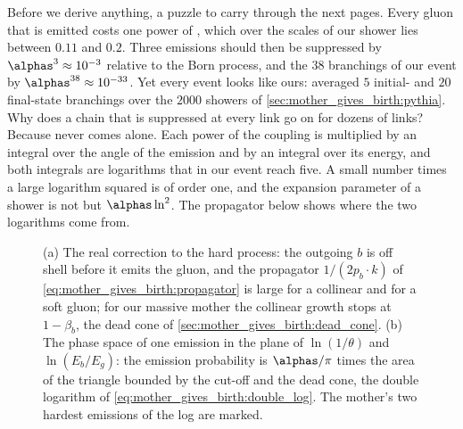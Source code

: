 Before we derive anything, a puzzle to carry through the next pages. Every
gluon that is emitted costs one power of \alphas, which over the scales of
our shower lies between $0.11$ and $0.2$. Three emissions should then be
suppressed by $\alphas^3\approx10^{-3}$ relative to the Born process, and
the $38$ branchings of our event by $\alphas^{38}\approx10^{-33}$. Yet
every event looks like ours: \PYTHIA averaged $5$ initial- and $20$
final-state branchings over the $2000$ showers of
\cref{sec:mother_gives_birth:pythia}. Why does a chain that is suppressed
at every link go on for dozens of links? Because \alphas never comes alone.
Each power of the coupling is multiplied by an integral over the angle of
the emission and by an integral over its energy, and both integrals are
logarithms that in our event reach five. A small number times a large
logarithm squared is of order one, and the expansion parameter of a shower
is not \alphas but $\alphas\ln^2$. The propagator below shows where the two
logarithms come from.

\begin{figure}[htbp]\centering
\resizebox{\textwidth}{!}{}
\caption[The propagator that makes a quark radiate, and the double-logarithmic phase space]{(a) The real correction to the hard process: the outgoing $b$ is off shell before it emits the gluon, and the propagator $1/(2p_b\cdot k)$ of \cref{eq:mother_gives_birth:propagator} is large for a collinear and for a soft gluon; for our massive mother the collinear growth stops at $1-\beta_b$, the dead cone of \cref{sec:mother_gives_birth:dead_cone}. (b) The phase space of one emission in the plane of $\ln(1/\theta)$ and $\ln(E_b/E_g)$: the emission probability is $\alphas/\pi$ times the area of the triangle bounded by the cut-off and the dead cone, the double logarithm of \cref{eq:mother_gives_birth:double_log}. The mother's two hardest emissions of the  log are marked.}
\label{fig:mother_gives_birth:propagator_sketch}
\end{figure}

